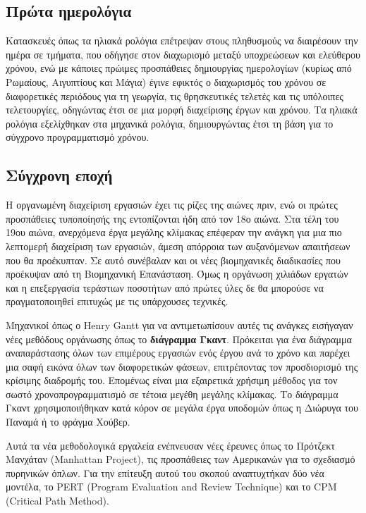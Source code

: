         \subsection{Πρώτα ημερολόγια}
            Κατασκευές όπως τα ηλιακά ρολόγια επέτρεψαν στους πληθυσμούς να διαιρέσουν την ημέρα σε τμήματα, που οδήγησε στον διαχωρισμό μεταξύ υποχρεώσεων και ελεύθερου χρόνου, ενώ με κάποιες πρώιμες προσπάθειες δημιουργίας ημερολογίων (κυρίως από Ρωμαίους, Αιγυπτίους και Μάγια) έγινε εφικτός ο διαχωρισμός του χρόνου σε διαφορετικές περιόδους για τη γεωργία, τις θρησκευτικές τελετές και τις υπόλοιπες τελετουργίες, οδηγώντας έτσι σε μια μορφή διαχείρισης έργων και χρόνου. Τα ηλιακά ρολόγια εξελίχθηκαν στα μηχανικά ρολόγια, δημιουργώντας έτσι τη βάση για το σύγχρονο προγραμματισμό χρόνου. \cite{Richards_2000}

        \subsection{Σύγχρονη εποχή}
            Η οργανωμένη διαχείριση εργασιών έχει τις ρίζες της αιώνες πριν, ενώ οι πρώτες προσπάθειες τυποποίησής της εντοπίζονται ήδη από τον 18ο αιώνα. Στα τέλη του 19ου αιώνα, ανερχόμενα έργα μεγάλης κλίμακας επέφεραν την ανάγκη για μια πιο λεπτομερή διαχείριση των εργασιών, άμεση απόρροια των αυξανόμενων απαιτήσεων που θα προέκυπταν. Σε αυτό συνέβαλαν και οι νέες βιομηχανικές διαδικασίες που προέκυψαν από τη Βιομηχανική Επανάσταση. Όμως η οργάνωση χιλιάδων εργατών και η επεξεργασία τεράστιων ποσοτήτων από πρώτες ύλες δε θα μπορούσε να πραγματοποιηθεί επιτυχώς με τις υπάρχουσες τεχνικές.

            Μηχανικοί όπως ο Henry Gantt για να αντιμετωπίσουν αυτές τις ανάγκες εισήγαγαν νέες μεθόδους οργάνωσης όπως το \textbf{διάγραμμα Γκαντ}. Πρόκειται για ένα διάγραμμα αναπαράστασης όλων των επιμέρους εργασιών ενός έργου ανά το χρόνο και παρέχει μια σαφή εικόνα όλων των διαφορετικών φάσεων, επιτρέποντας τον προσδιορισμό της κρίσιμης διαδρομής του. Επομένως είναι μια εξαιρετικά χρήσιμη μέθοδος για τον σωστό χρονοπρογραμματισμό σε τέτοια μεγέθη μεγάλης κλίμακας. Το διάγραμμα Γκαντ χρησιμοποιήθηκαν κατά κόρον σε μεγάλα έργα υποδομών όπως η Διώρυγα του Παναμά ή το φράγμα Χούβερ. \cite{strefapmiHooverGreatest}

            Αυτά τα νέα μεθοδολογικά εργαλεία ενέπνευσαν νέες έρευνες όπως το Πρότζεκτ Μανχάταν (Manhattan Project), τις προσπάθειες των Αμερικανών για το σχεδιασμό πυρηνικών όπλων. Για την επίτευξη αυτού του σκοπού αναπτυχτήκαν δύο νέα μοντέλα, το PERT (Program Evaluation and Review Technique) και το CPM (Critical Path Method). \cite{SaylorAcademyProjectManagement}

